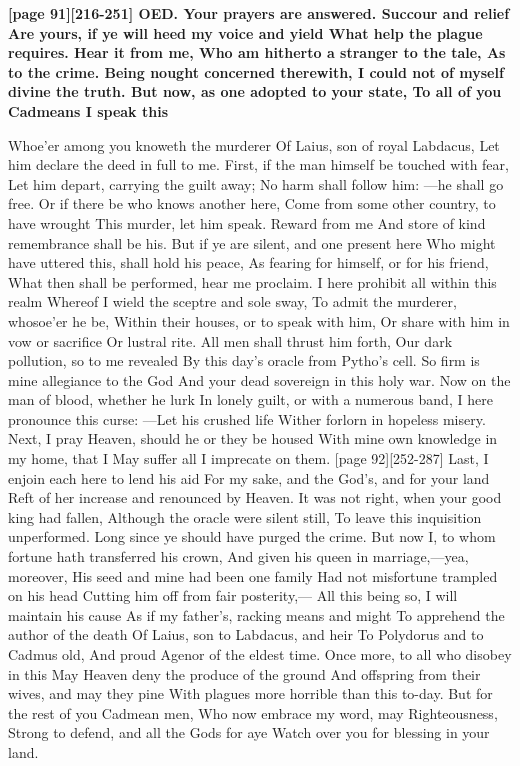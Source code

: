 \documentclass[11pt,letter]{book}
\begin{document}
\par \textbf{[page 91][216-251] OED. Your prayers are answered. Succour and relief Are yours, if ye will heed my voice and yield What help the plague requires. Hear it from me, Who am hitherto a stranger to the tale, As to the crime. Being nought concerned therewith, I could not of myself divine the truth. But now, as one adopted to your state, To all of you Cadmeans I speak this}
\par   Whoe’er among you knoweth the murderer Of Laius, son of royal Labdacus, Let him declare the deed in full to me. First, if the man himself be touched with fear, Let him depart, carrying the guilt away; No harm shall follow him: —he shall go free. Or if there be who knows another here, Come from some other country, to have wrought This murder, let him speak. Reward from me And store of kind remembrance shall be his. But if ye are silent, and one present here Who might have uttered this, shall hold his peace, As fearing for himself, or for his friend, What then shall be performed, hear me proclaim. I here prohibit all within this realm Whereof I wield the sceptre and sole sway, To admit the murderer, whosoe’er he be, Within their houses, or to speak with him, Or share with him in vow or sacrifice Or lustral rite. All men shall thrust him forth, Our dark pollution, so to me revealed By this day’s oracle from Pytho’s cell. So firm is mine allegiance to the God And your dead sovereign in this holy war. Now on the man of blood, whether he lurk In lonely guilt, or with a numerous band, I here pronounce this curse: —Let his crushed life Wither forlorn in hopeless misery. Next, I pray Heaven, should he or they be housed With mine own knowledge in my home, that I May suffer all I imprecate on them. [page 92][252-287] Last, I enjoin each here to lend his aid For my sake, and the God’s, and for your land Reft of her increase and renounced by Heaven. It was not right, when your good king had fallen, Although the oracle were silent still, To leave this inquisition unperformed. Long since ye should have purged the crime. But now I, to whom fortune hath transferred his crown, And given his queen in marriage,—yea, moreover, His seed and mine had been one family Had not misfortune trampled on his head Cutting him off from fair posterity,— All this being so, I will maintain his cause As if my father’s, racking means and might To apprehend the author of the death Of Laius, son to Labdacus, and heir To Polydorus and to Cadmus old, And proud Agenor of the eldest time. Once more, to all who disobey in this May Heaven deny the produce of the ground And offspring from their wives, and may they pine With plagues more horrible than this to-day. But for the rest of you Cadmean men, Who now embrace my word, may Righteousness, Strong to defend, and all the Gods for aye Watch over you for blessing in your land.
\end{document}
